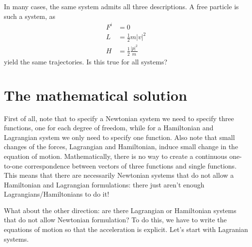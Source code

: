 \documentclass[11pt]{article}
\begin{document}
In many cases, the same system admits all three descriptions. A free particle is such a system, as
\begin{equation}
\begin{aligned}
F^i&=0 \\
L&=\frac{1}{2}m|v|^2 \\
H&=\frac{1}{2}\frac{|p|^2}{m}
\end{aligned}
\end{equation}
yield the same trajectories. Is this true for all systems?

\section{The mathematical solution}
First of all, note that to specify a Newtonian system we need to specify three functions, one for each degree of freedom, while for a Hamiltonian and Lagrangian system we only need to specify one function. Also note that small changes of the forces, Lagrangian and Hamiltonian, induce small change in the equation of motion. Mathematically, there is no way to create a continuous one-to-one correspondence between vectors of three functions and single functions. This means that there are necessarily Newtonian systems that do not allow a Hamiltonian and Lagrangian formulations: there just aren't enough Lagrangians/Hamiltonians to do it!

What about the other direction: are there Lagrangian or Hamiltonian systems that do not allow Newtonian formulation? To do this, we have to write the equations of motion so that the acceleration is explicit. Let's start with Lagranian systems.
\end{document}
